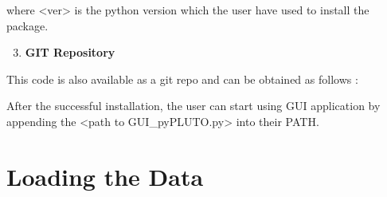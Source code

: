 \documentclass[letterpaper,10pt,english]{sphinxmanual}
\begin{document}
where \textless{}ver\textgreater{} is the python version which the user have used to install the package.
\begin{enumerate}
\setcounter{enumi}{2}
\item {} 
\textbf{GIT Repository}

\end{enumerate}

This code is also available as a git repo and can be obtained as
follows : 

After the successful installation, the user can start using GUI application by appending the \textless{}path to GUI\_pyPLUTO.py\textgreater{} into their PATH.


\section{Loading the Data}
\label{pload:loading-the-data}\label{pload::doc}
\end{document}
